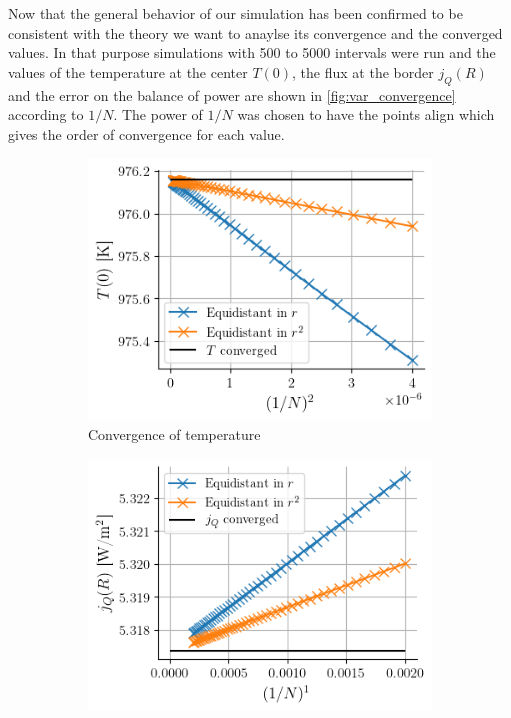 Now that the general behavior of our simulation has been confirmed to be consistent with the theory we want to anaylse its convergence and the converged values. In that purpose simulations with 500 to 5000 intervals were run and the values of the temperature at the center $T(0)$, the flux at the border $j_Q(R)$ and the error on the balance of power are shown in \autoref{fig:var_convergence} according to $1/N$. The power of $1/N$ was chosen to have the points align which gives the order of convergence for each value.
\begin{figure}[H]
    \centering
    \begin{subfigure}{0.48\linewidth}
        \centering
        \includegraphics[width=\linewidth]{figures/var_conv_T.png}
        \caption{Convergence of temperature}
        \label{fig:var_conv_T}
    \end{subfigure}
    \begin{subfigure}{0.48\linewidth}
        \centering
        \includegraphics[width=\linewidth]{figures/var_conv_j.png}

\end{subfigure}
\end{figure}
